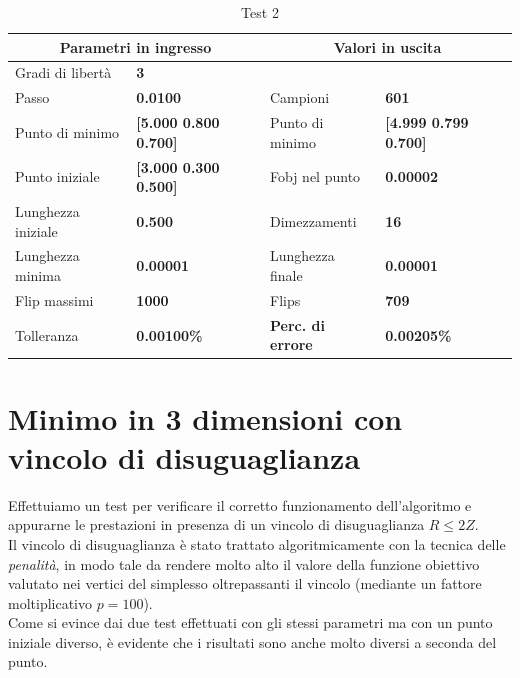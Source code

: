 \documentclass[a4paper, 11pt]{article}
\begin{document}
    \begin{table}[h]
        \caption{Test 2}
        \begin{center}
        \begin{tabular}{|l|l|l|l|} 
        \hline 
        \multicolumn{2}{|c|}{\textbf{Parametri in ingresso}} & \multicolumn{2}{c|}{\textbf{Valori in uscita}} \\ \hline
        Gradi di libertà  & \textbf{3} &  &  \\ \hline 
        Passo & \textbf{0.0100} & Campioni & \textbf{601} \\ \hline 
        Punto di minimo & \textbf{{[}5.000 0.800 0.700{]}} & Punto di minimo & \textbf{{[}4.999 0.799 0.700{]}} \\ \hline 
        Punto iniziale & \textbf{{[}3.000 0.300 0.500{]}} & Fobj nel punto & \textbf{0.00002} \\ \hline 
        Lunghezza iniziale & \textbf{0.500} & Dimezzamenti & \textbf{16} \\ \hline 
        Lunghezza minima & \textbf{0.00001} & Lunghezza finale & \textbf{0.00001} \\ \hline
        Flip massimi & \textbf{1000} & Flips & \textbf{709} \\ \hline 
        Tolleranza & \textbf{0.00100\%} & \textbf{Perc. di errore} & \textbf{0.00205\%} \\ \hline 
        \end{tabular}
        \end{center}
        \end{table}
\noindent



\newpage
\section{Minimo in 3 dimensioni con vincolo di disuguaglianza}

Effettuiamo un test per verificare il corretto funzionamento dell'algoritmo e
appurarne le prestazioni in presenza di un vincolo di disuguaglianza $R \le 2Z$.
\\
Il vincolo di disuguaglianza è stato trattato algoritmicamente con la tecnica
delle \emph{penalità}, in modo tale da rendere molto alto il valore della
funzione obiettivo valutato nei vertici del simplesso oltrepassanti il vincolo
(mediante un fattore moltiplicativo $p = 100$). \\
Come si evince dai due test effettuati con gli stessi parametri ma con un punto
iniziale diverso, è evidente che i risultati sono anche molto diversi a seconda
del punto.
\end{document}
